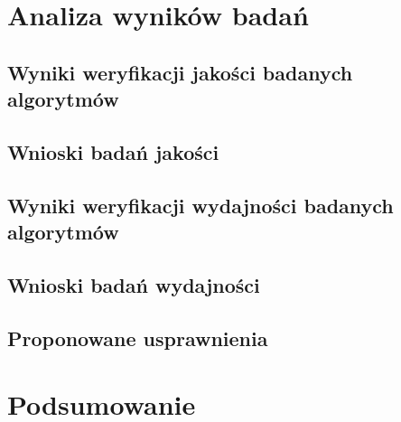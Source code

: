 \chapter{Analiza wyników badań}\label{Chapter_AnalizaRezultatow}

  \section{Wyniki weryfikacji jakości badanych algorytmów}\label{Section_Quality}

  \section{Wnioski badań jakości}\label{Section_QualityWnioski}

  \section{Wyniki weryfikacji wydajności badanych algorytmów}\label{Section_Performance}

  \section{Wnioski badań wydajności}\label{Section_PerformanceWnioski}

  \section{Proponowane usprawnienia}\label{Section_Usprawnienia}
    \cite{HandOverFaceOcclusion07}

\chapter{Podsumowanie}\label{Section_Podsumowanie}